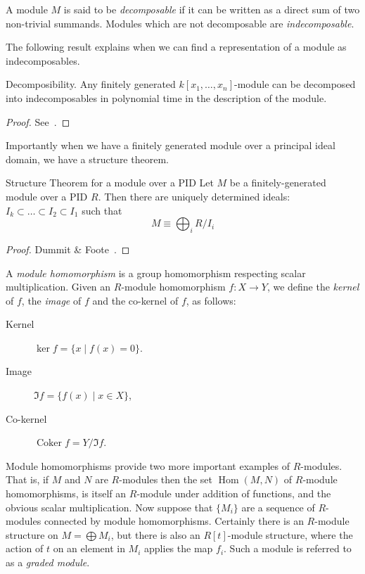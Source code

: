 \begin{definition}
A module $M$ is said to be \emph{decomposable} if it can be written as a direct sum of two non-trivial summands. Modules which are not decomposable are \emph{indecomposable}. 
\end{definition}
The following result explains when we can find a representation of a module as indecomposables.
\begin{theorem}{Decomposibility.}
Any finitely generated $k[x_1, \ldots, x_n]$-module can be decomposed into indecomposables in polynomial time in the description of the module. 
\end{theorem}
\begin{proof}
See~\cite{caikm-ptafm-1997}.
\end{proof}
Importantly when we have a finitely generated module over a principal ideal domain, we have a structure theorem. 
\begin{theorem}{Structure Theorem for a module over a PID}
Let $M$ be a finitely-generated module over a PID $R$. Then there are uniquely determined ideals:
$I_k \subset \ldots \subset I_2  \subset I_1$ 
such that
\[ M \equiv \bigoplus_i R/I_i \]
\end{theorem}
\begin{proof}
Dummit \& Foote~\cite{dummitnfoote}.
\end{proof}
\begin{definition}
A \emph{module homomorphism} is a group homomorphism respecting scalar multiplication. Given an $R$-module homomorphism $f: X \rightarrow Y $, we define the \emph{kernel} of $f$, the \emph{image} of $f$ and the co-kernel of $f$, as follows: 
\begin{description}
\item[Kernel] $\ker{f} = \{ x \mid f(x) = 0 \}$. 
\item[Image] $\Im{f} = \{ f(x) \mid x \in X\}$, 
\item[Co-kernel] $\operatorname{Coker}{f} = Y/\Im{f}$.
\end{description}
\end{definition}

Module homomorphisms provide two more important examples of $R$-modules. That is, if $M$ and $N$ are $R$-modules then the set $\operatorname{Hom}(M,N)$ of $R$-module homomorphisms, is itself an $R$-module under addition of functions, and the obvious scalar multiplication. Now suppose that $\{M_i\}$ are a sequence of $R$-modules connected by module homomorphisms. Certainly there is an $R$-module structure on $M = \bigoplus M_i$, but there is also an $R[t]$-module structure, where the action of $t$ on an element in $M_i$ applies the map $f_i$. Such a module is referred to as a \emph{graded module}.

